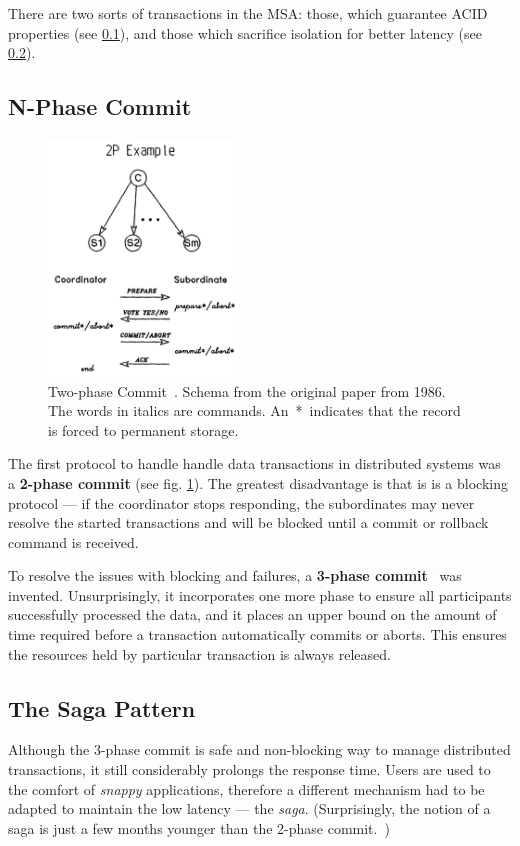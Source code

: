 \documentclass[thesis=M,english,hidelinks]{FITthesis}[2012/10/20]
\begin{document}
There are two sorts of transactions in the \acrshort{MSA}: those, which guarantee \acrshort{ACID}~\cite{ACID} properties (see \ref{sec:n-phase}), and those which sacrifice isolation for better latency (see \ref{sec:saga}).

\subsection{N-Phase Commit}
\label{sec:n-phase}

\begin{figure}
  \centering
    \includegraphics[width=0.45\textwidth]{images/2PC.png}
    \caption[Two-phase Commit]{Two-phase Commit~\cite{two-phase-commit}. Schema from the original paper from 1986. The words in italics are commands. An~*~indicates that the record is forced to permanent storage.}
    \label{fig:two-phase}
\end{figure}

The first protocol to handle handle data transactions in distributed systems was a \textbf{2-phase commit} (see fig. \ref{fig:two-phase}). The greatest disadvantage is that is is a blocking protocol --- if the coordinator stops responding, the subordinates may never resolve the started transactions and will be blocked until a commit or rollback command is received.

To resolve the issues with blocking and failures, a \textbf{3-phase commit}~\cite{3-phase-commit} was invented. Unsurprisingly, it incorporates one more phase to ensure all participants successfully processed the data, and it places an upper bound on the amount of time required before a transaction automatically commits or aborts. This ensures the resources held by particular transaction is always released.

\subsection{The Saga Pattern}
\label{sec:saga}
Although the 3-phase commit is safe and non-blocking way to manage distributed transactions, it still considerably prolongs the response time. Users are used to the comfort of \textit{snappy} applications, therefore a different mechanism had to be adapted to maintain the low latency --- the \textit{saga}. (Surprisingly, the notion of a saga is just a few months younger than the 2-phase commit.~\cite{sagas})
\end{document}
